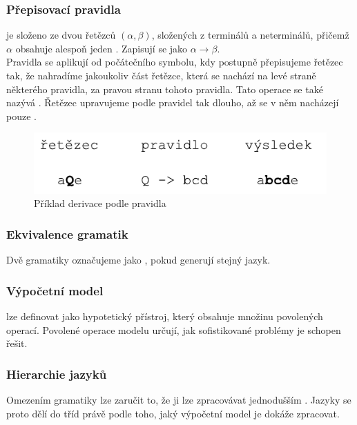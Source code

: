 \subsubsection*{Přepisovací pravidla}
\label{term:rewriteRule}

 je složeno ze dvou řetězců $(\alpha, \beta)$,
složených z terminálů a neterminálů, přičemž $\alpha$ obsahuje alespoň jeden .
Zapisují se jako $\alpha \rightarrow \beta$.\\
Pravidla se aplikují od počátečního symbolu, kdy postupně přepisujeme řetězec tak, že nahradíme
jakoukoliv část řetězce, která se nachází na levé straně některého pravidla, za pravou stranu tohoto pravidla.
Tato operace se také nazývá .
Řetězec upravujeme podle pravidel tak dlouho, až se v něm nacházejí pouze .

\begin{figure}[H]
  \centering
  \includegraphics{fig/rewriteRule.pdf}
  \caption{Příklad derivace podle pravidla}
  \label{img:rewriteRule}
\end{figure}

\subsubsection*{Ekvivalence gramatik}
Dvě gramatiky označujeme jako , pokud generují stejný jazyk.

\subsubsection*{Výpočetní model}

 lze definovat jako hypotetický přístroj,
který obsahuje množinu povolených operací. Povolené operace modelu určují,
jak sofistikované problémy je schopen řešit.

\subsubsection*{Hierarchie jazyků}
\label{subsec:chomHierarchy}

Omezením gramatiky lze zaručit to, že ji lze zpracovávat jednodušším
. Jazyky se proto
dělí do tříd právě podle toho, jaký výpočetní model je dokáže zpracovat.\\

